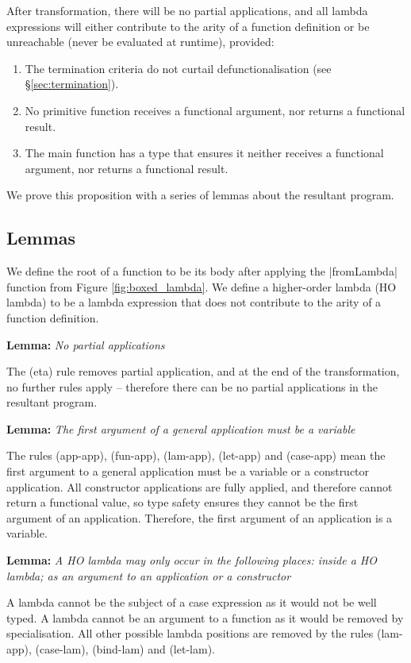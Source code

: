 \documentclass[preprint]{sigplanconf}
\newenvironment{lemma}[1]
    {\smallskip
     \noindent\textbf{Lemma:} \textit{#1}}
    {\noexample}
\begin{document}
After transformation, there will be no partial applications, and all lambda expressions will either contribute to the arity of a function definition or be unreachable (never be evaluated at runtime), provided:

\begin{enumerate}
\item The termination criteria do not curtail defunctionalisation (see \S\ref{sec:termination}).
\item No primitive function receives a functional argument, nor returns a functional result.
\item The main function has a type that ensures it neither receives a functional argument, nor returns a functional result.
\end{enumerate}

We prove this proposition with a series of lemmas about the resultant program.

\subsection{Lemmas}

We define the root of a function to be its body after applying the |fromLambda| function from Figure \ref{fig:boxed_lambda}. We define a higher-order lambda (HO lambda) to be a lambda expression that does not contribute to the arity of a function definition.

\begin{lemma}{No partial applications}

The (eta) rule removes partial application, and at the end of the transformation, no further rules apply -- therefore there can be no partial applications in the resultant program.
\end{lemma}

\begin{lemma}{The first argument of a general application must be a variable}

The rules (app-app), (fun-app), (lam-app), (let-app) and (case-app) mean the first argument to a general application must be a variable or a constructor application. All constructor applications are fully applied, and therefore cannot return a functional value, so type safety ensures they cannot be the first argument of an application. Therefore, the first argument of an application is a variable.
\end{lemma}

\begin{lemma}{A HO lambda may only occur in the following places: inside a HO lambda; as an argument to an application or a constructor}

A lambda cannot be the subject of a case expression as it would not be well typed. A lambda cannot be an argument to a function as it would be removed by specialisation. All other possible lambda positions are removed by the rules (lam-app), (case-lam), (bind-lam) and (let-lam).
\end{lemma}
\end{document}
